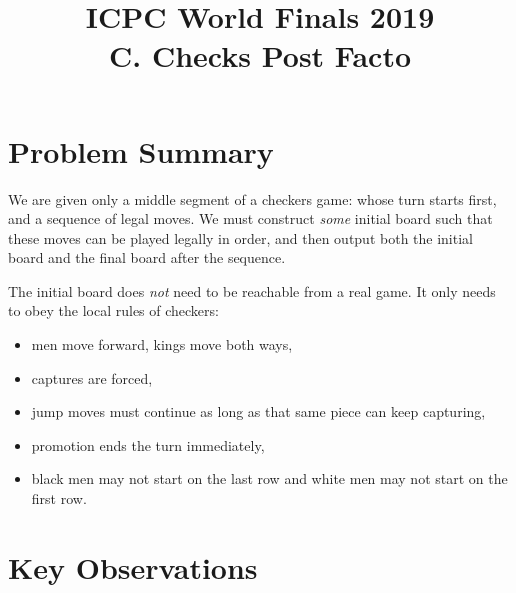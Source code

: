 \documentclass[11pt]{article}
\title{ICPC World Finals 2019\\C. Checks Post Facto}
\author{}
\date{}
\begin{document}
\maketitle

\section*{Problem Summary}

We are given only a middle segment of a checkers game: whose turn starts first, and a sequence of legal moves. We must construct \emph{some} initial board such that these moves can be played legally in order, and then output both the initial board and the final board after the sequence.

The initial board does \emph{not} need to be reachable from a real game. It only needs to obey the local rules of checkers:
\begin{itemize}[leftmargin=*]
    \item men move forward, kings move both ways,
    \item captures are forced,
    \item jump moves must continue as long as that same piece can keep capturing,
    \item promotion ends the turn immediately,
    \item black men may not start on the last row and white men may not start on the first row.
\end{itemize}

\section*{Key Observations}
\end{document}

